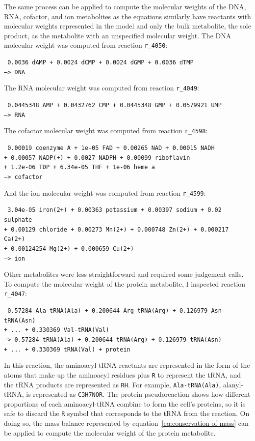 The same process can be applied to compute the molecular weights of the DNA, RNA, cofactor, and ion metabolites as the equations similarly have reactants with molecular weights represented in the model and only the bulk metabolite, the sole product, as the metabolite with an unspecified molecular weight.
The DNA molecular weight was computed from reaction \texttt{r\_4050}:

\texttt{
  0.0036 dAMP + 0.0024 dCMP + 0.0024 dGMP + 0.0036 dTMP \\
  --> DNA
}

The RNA molecular weight was computed from reaction \texttt{r\_4049}:

\texttt{
  0.0445348 AMP + 0.0432762 CMP + 0.0445348 GMP + 0.0579921 UMP \\
  --> RNA
}

The cofactor molecular weight was computed from reaction \texttt{r\_4598}:

\texttt{
  0.00019 coenzyme A + 1e-05 FAD + 0.00265 NAD + 0.00015 NADH \\
  + 0.00057 NADP(+) + 0.0027 NADPH + 0.00099 riboflavin \\
  + 1.2e-06 TDP + 6.34e-05 THF + 1e-06 heme a \\
  --> cofactor
}

And the ion molecular weight was computed from reaction \texttt{r\_4599}:

\texttt{
  3.04e-05 iron(2+) + 0.00363 potassium + 0.00397 sodium + 0.02 sulphate \\
  + 0.00129 chloride + 0.00273 Mn(2+) + 0.000748 Zn(2+) + 0.000217 Ca(2+) \\
  + 0.00124254 Mg(2+) + 0.000659 Cu(2+) \\
  --> ion
}

Other metabolites were less straightforward and required some judgement calls.
To compute the molecular weight of the protein metabolite, I inspected reaction \texttt{r\_4047}:

\texttt{
  0.57284 Ala-tRNA(Ala) + 0.200644 Arg-tRNA(Arg) + 0.126979 Asn-tRNA(Asn)\\
  + ... + 0.330369 Val-tRNA(Val) \\
  --> 0.57284 tRNA(Ala) + 0.200644 tRNA(Arg) + 0.126979 tRNA(Asn) \\
  + ... + 0.330369 tRNA(Val) + protein
}

In this reaction, the aminoacyl-tRNA reactants are represented in the form of the atoms that make up the aminoacyl residues plus \texttt{R} to represent the tRNA, and the tRNA products are represented as \texttt{RH}.
For example, \texttt{Ala-tRNA(Ala)}, alanyl-tRNA, is represented as \texttt{C3H7NOR}.
The protein pseudoreaction shows how different proportions of each aminoacyl-tRNA combine to form the cell's proteins, so it is safe to discard the \texttt{R} symbol that corresponds to the tRNA from the reaction.
On doing so, the mass balance represented by equation~\ref{eq:conservation-of-mass} can be applied to compute the molecular weight of the protein metabolite.


